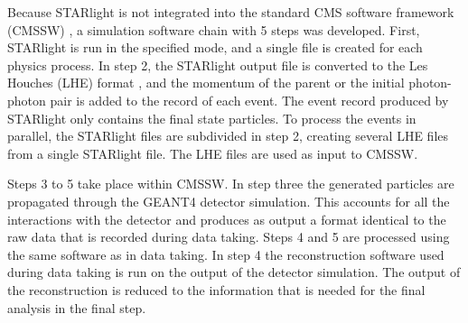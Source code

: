     Because STARlight is not integrated into the standard CMS software 
      framework (CMSSW) \DIFaddbegin {}\DIFaddend , a simulation software chain with 5 steps 
      was developed.
    First, STARlight is run in the specified mode, and a single file is 
      created for each physics process. 
    In step 2, the STARlight output file is converted to the Les Houches (LHE) 
      format \cite{lheFormat}, and the momentum of the parent \JPsi{} or the 
      initial photon-photon pair is added to the record of each event.
    The event record produced by STARlight only contains the final state 
      particles.
    To process the events in parallel, the STARlight files are subdivided 
      in step 2, creating several LHE files from a single STARlight file.
    The LHE files are used as input to CMSSW.

    Steps 3 to 5 take place within CMSSW. 
    In step three the generated particles are propagated through the GEANT4 
      \cite{geant} detector simulation.
    This accounts for all the interactions with the detector and produces as 
      output a format identical to the raw data that is recorded during data
      taking.
    Steps 4 and 5 are processed using the same software as in data taking.
    In step 4 the reconstruction software used during data taking is run on 
      the output of the detector simulation.
    The output of the reconstruction is reduced to the information that is 
      needed for the final analysis in the final step.

